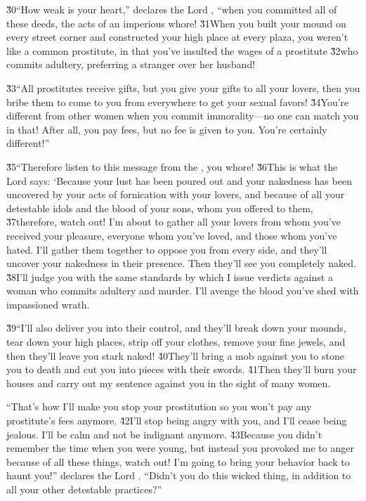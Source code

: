 \v{30}``How weak is your heart,'' declares the Lord , ``when you committed all of these deeds, the acts of an imperious whore! \v{31}When you built your mound on every street corner and constructed your high place at every plaza, you weren't like a common prostitute, in that you've insulted the wages of a prostitute \v{32}who commits adultery, preferring a stranger over her husband!

\v{33}``All prostitutes receive gifts, but you give your gifts to all your lovers, then you bribe them to come to you from everywhere to get your sexual favors! \v{34}You're different from other women when you commit immorality---no one can match you in that! After all, you pay fees, but no fee is given to you. You're certainly different!''

\v{35}``Therefore listen to this message from the , you whore! \v{36}This is what the Lord  says: `Because your lust has been poured out and your nakedness has been uncovered by your acts of fornication with your lovers, and because of all your detestable idols and the blood of your sons, whom you offered to them, \v{37}therefore, watch out! I'm about to gather all your lovers from whom you've received your pleasure, everyone whom you've loved, and those whom you've hated. I'll gather them together to oppose you from every side, and they'll uncover your nakedness in their presence. Then they'll see you completely naked. \v{38}I'll judge you with the same standards by which I issue verdicts against a woman who commits adultery and murder. I'll avenge the blood you've shed with impassioned wrath.

\v{39}``I'll also deliver you into their control, and they'll break down your mounds, tear down your high places, strip off your clothes, remove your fine jewels, and then they'll leave you stark naked! \v{40}They'll bring a mob against you to stone you to death and cut you into pieces with their swords. \v{41}Then they'll burn your houses and carry out my sentence against you in the sight of many women.

``That's how I'll make you stop your prostitution so you won't pay any prostitute's fees anymore. \v{42}I'll stop being angry with you, and I'll cease being jealous. I'll be calm and not be indignant anymore. \v{43}Because you didn't remember the time when you were young, but instead you provoked me to anger because of all these things, watch out! I'm going to bring your behavior back to haunt you!'' declares the Lord . ``Didn't you do this wicked thing, in addition to all your other detestable practices?''

